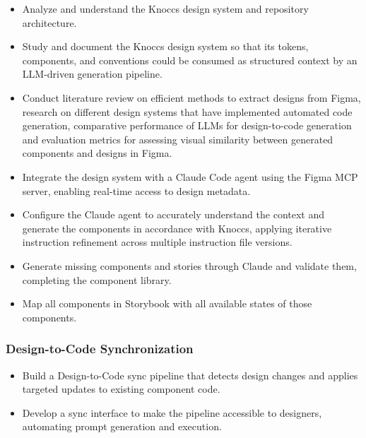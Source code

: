 \begin{itemize}
    \item Analyze and understand the Knoccs design system and repository architecture.

    \item Study and document the Knoccs design system so that its tokens, components, and conventions could be consumed as structured context by an LLM-driven generation pipeline.

    \item Conduct literature review on efficient methods to extract designs from Figma, research on different design systems that have implemented automated code generation, comparative performance of LLMs for design-to-code generation and evaluation metrics for assessing visual similarity between generated components and designs in Figma.

    \item Integrate the design system with a Claude Code agent using the Figma MCP server, enabling real-time access to design metadata.

    \item Configure the Claude agent to accurately understand the context and generate the components in accordance with Knoccs, applying iterative instruction refinement across multiple instruction file versions.

    \item Generate missing components and stories through Claude and validate them, completing the component library.

    \item Map all components in Storybook with all available states of those components.

\end{itemize}

\subsubsection{Design-to-Code Synchronization}

\begin{itemize}
    \item Build a Design-to-Code sync pipeline that detects design changes and applies targeted updates to existing component code.

    \item Develop a sync interface to make the pipeline accessible to designers, automating prompt generation and execution.
\end{itemize}

